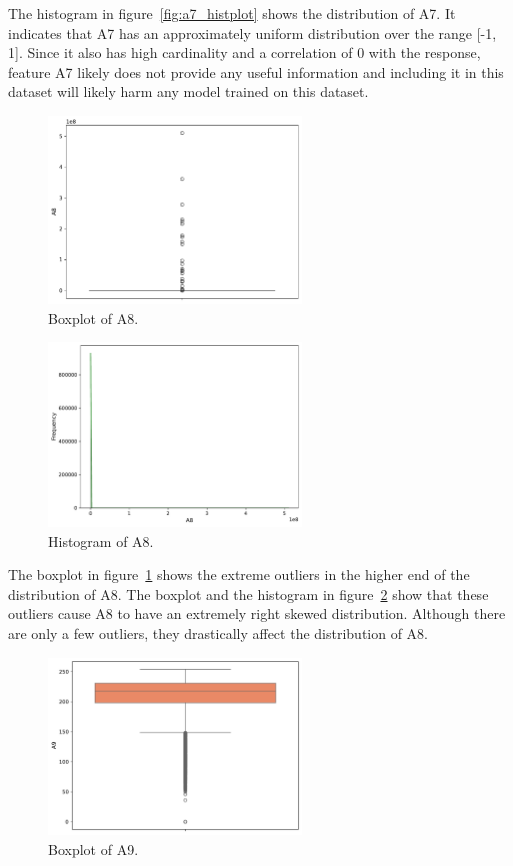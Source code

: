 \documentclass[11pt]{report}
\begin{document}
The histogram in figure~\ref{fig:a7_histplot} shows the distribution of A7. It indicates that A7 has an approximately uniform distribution over the range [-1, 1]. Since it also has high cardinality and a correlation of 0 with the response, feature A7 likely does not provide any useful information and including it in this dataset will likely harm any model trained on this dataset.

\begin{figure}[H]
    \centering
    \includegraphics[width=0.6\textwidth]{images/A8_boxplot.pdf}
    \caption{Boxplot of A8.}
    \label{fig:a8_boxplot}
\end{figure}

\begin{figure}[H]
    \centering
    \includegraphics[width=0.6\textwidth]{images/A8_histplot.pdf}
    \caption{Histogram of A8.}
    \label{fig:a8_histplot}
\end{figure}

The boxplot in figure~\ref{fig:a8_boxplot} shows the extreme outliers in the higher end of the distribution of A8. The boxplot and the histogram in figure~\ref{fig:a8_histplot} show that these outliers cause A8 to have an extremely right skewed distribution. Although there are only a few outliers, they drastically affect the distribution of A8.

\begin{figure}[H]
    \centering
    \includegraphics[width=0.6\textwidth]{images/A9_boxplot.pdf}
    \caption{Boxplot of A9.}
    \label{fig:a9_boxplot}
\end{figure}
\end{document}
